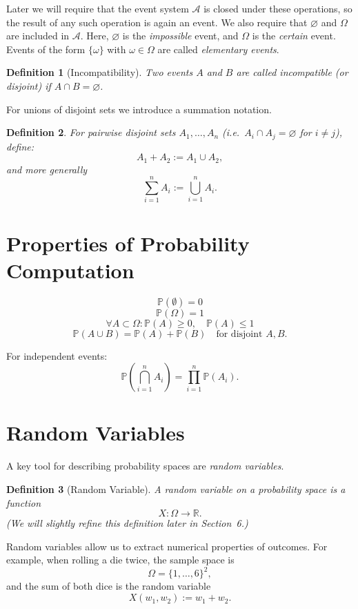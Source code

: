 \documentclass{article}
\newtheorem{definition}{Definition}
\begin{document}
Later we will require that the event system $\mathcal{A}$ is 
closed under these operations, so the result of any such operation is again an event.  
We also require that $\varnothing$ and $\Omega$ are included in $\mathcal{A}$.  
Here, $\varnothing$ is the \emph{impossible} event, and $\Omega$ is the \emph{certain} event.  
Events of the form $\{\omega\}$ with $\omega \in \Omega$ are called \emph{elementary events}.

\begin{definition}[Incompatibility]
Two events $A$ and $B$ are called \emph{incompatible} (or \emph{disjoint}) 
if $A \cap B = \varnothing$.
\end{definition}

For unions of disjoint sets we introduce a summation notation.

\begin{definition}
For pairwise disjoint sets $A_1, \ldots, A_n$ (i.e.\ $A_i \cap A_j = \varnothing$ for $i \ne j$), define:
\[
A_1 + A_2 := A_1 \cup A_2,
\]
and more generally
\[
\sum_{i=1}^n A_i := \bigcup_{i=1}^n A_i.
\]
\end{definition}
\section{Properties of Probability Computation}

\[
\mathbb{P}(\emptyset) = 0
\]
\[
\mathbb{P}(\Omega) = 1
\]
\[
\forall A \subset \Omega : \mathbb{P}(A) \ge 0,\quad \mathbb{P}(A) \le 1
\]
\[
\mathbb{P}(A \cup B) = \mathbb{P}(A) + \mathbb{P}(B)
\quad \text{for disjoint } A,B.
\]

For independent events:
\[
\mathbb{P}\!\left(\bigcap_{i=1}^n A_i\right)
= \prod_{i=1}^n \mathbb{P}(A_i).
\]

\section{Random Variables}

A key tool for describing probability spaces are \emph{random variables}.

\begin{definition}[Random Variable]
A random variable on a probability space is a function
\[
X : \Omega \to \mathbb{R}.
\]
(We will slightly refine this definition later in Section~6.)
\end{definition}

Random variables allow us to extract numerical properties of outcomes.  
For example, when rolling a die twice, the sample space is
\[
\Omega = \{1, \dots, 6\}^2,
\]
and the sum of both dice is the random variable
\[
X(w_1, w_2) := w_1 + w_2.
\]
\end{document}
